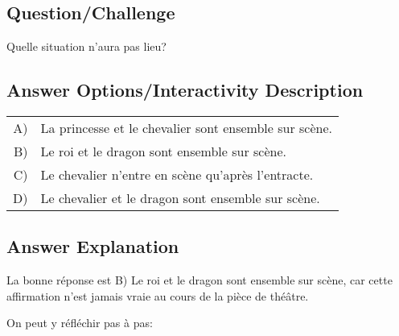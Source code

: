\documentclass[a4paper,11pt]{report}
\begin{document}
{\em

\subsection*{Question/Challenge}

Quelle situation n’aura pas lieu?

}\begingroup
\renewcommand{\arraystretch}{1.5}
\subsection*{Answer Options/Interactivity Description}

\begin{tabular}{ @{} r l @{} }
  A) & La princesse et le chevalier sont ensemble sur scène. \\ 
  B) & Le roi et le dragon sont ensemble sur scène. \\ 
  C) & Le chevalier n’entre en scène qu’après l’entracte. \\ 
  D) & Le chevalier et le dragon sont ensemble sur scène.
\end{tabular}

\endgroup

\subsection*{Answer Explanation}

La bonne réponse est B) Le roi et le dragon sont ensemble sur scène, car cette affirmation n’est jamais vraie au cours de la pièce de théâtre.

On peut y réfléchir pas à pas:
\end{document}
